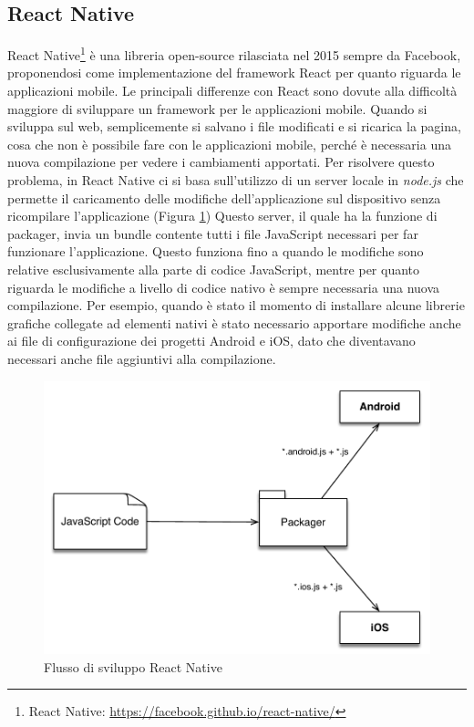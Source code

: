 \subsection{React Native}\label{sec:react-native}
React Native\footnote{React Native: \url{https://facebook.github.io/react-native/}} è una libreria open-source rilasciata nel 2015 sempre da Facebook, proponendosi come implementazione del framework React per quanto riguarda le applicazioni mobile.
Le principali differenze con React sono dovute alla difficoltà maggiore di sviluppare un framework per le applicazioni mobile. 
Quando si sviluppa sul web, semplicemente si salvano i file modificati e si ricarica la pagina, cosa che non è possibile fare con le applicazioni mobile, perché è necessaria una nuova compilazione per vedere i cambiamenti apportati.
Per risolvere questo problema, in React Native ci si basa sull'utilizzo di un server locale in \emph{node.js} che permette il caricamento delle modifiche dell'applicazione sul dispositivo senza ricompilare l'applicazione (Figura \ref{fig:flusso-sviluppo-react-native}) Questo server, il quale ha la funzione di packager, invia un bundle contente tutti i file JavaScript necessari per far funzionare l'applicazione. Questo funziona fino a quando le modifiche sono relative esclusivamente alla parte di codice JavaScript, mentre per quanto riguarda le modifiche a livello di codice nativo è sempre necessaria una nuova compilazione. Per esempio, quando è stato il momento di installare alcune librerie grafiche collegate ad elementi nativi è stato necessario apportare modifiche anche ai file di configurazione dei progetti Android e iOS, dato che diventavano necessari anche file aggiuntivi alla compilazione.

\begin{figure}[ht]
	\centering
	\includegraphics[width=\textwidth]{6-implementazione-app/immagini/flusso-sviluppo-react-native.pdf}
	\caption{Flusso di sviluppo React Native\label{fig:flusso-sviluppo-react-native}}
\end{figure}

